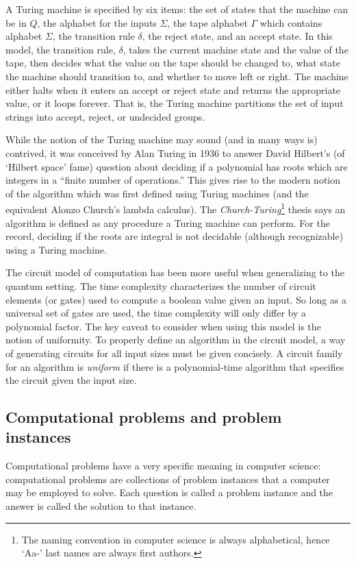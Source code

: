 \documentclass[11pt,oneside,final]{huthesis}%
\begin{document}
A Turing machine is specified by six items: the set of states that the machine can be in $Q$, the alphabet for the inputs $\Sigma$, the tape alphabet $\Gamma$ which contains alphabet $\Sigma$, the transition rule $\delta$, the reject state, and an accept state.  In this model, the transition rule, $\delta$, takes the current machine state and the value of the tape, then decides what the value on the tape should be changed to, what state the machine should transition to, and whether to move left or right. The machine either halts when it enters an accept or reject state and returns the appropriate value, or it loops forever.  That is, the Turing machine partitions the set of input strings into accept, reject, or undecided groups.

While the notion of the Turing machine may sound (and in many ways is) contrived, it was conceived by Alan Turing in 1936 to answer David Hilbert's (of `Hilbert space' fame) question about deciding if a polynomial has roots which are integers in a ``finite number of operations.''  This gives rise to the modern notion of the algorithm which was first defined using Turing machines (and the equivalent Alonzo Church's lambda calculus).  The \emph{Church-Turing}\footnote{The naming convention in computer science is always alphabetical, hence `Aa-' last names are always first authors.} thesis says an algorithm is defined as any procedure a Turing machine can perform. For the record, deciding if the roots are integral is not decidable (although recognizable) using a Turing machine.  

The circuit model of computation has been more useful when generalizing to the quantum setting. The time complexity characterizes the number of circuit elements (or gates) used to compute a boolean value given an input.  So long as a universal set of gates are used, the time complexity will only differ by a polynomial factor.  The key caveat to consider when using this model is the notion of uniformity.  To properly define an algorithm in the circuit model, a way of generating circuits for all input sizes must be given concisely.  A circuit family for an algorithm is \emph{uniform} if there is a polynomial-time algorithm that specifies the circuit given the input size.  

\subsection{Computational problems and problem instances}
Computational problems have a very specific meaning in computer science: computational problems are collections of problem instances that a computer may be employed to solve. 
Each question is called a problem instance and the answer is called the solution to that instance.  
\end{document}
